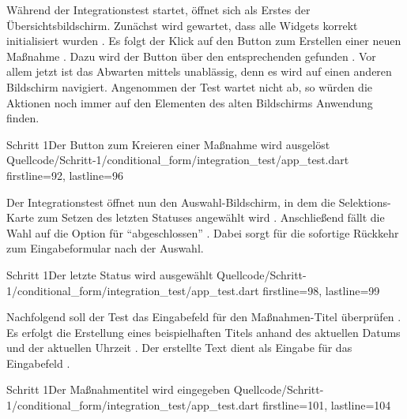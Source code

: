 Während der Integrationstest startet, öffnet sich als Erstes der Übersichtsbildschirm.
Zunächst wird gewartet, dass alle Widgets korrekt initialisiert wurden .
Es folgt der Klick auf den Button zum Erstellen einer neuen Maßnahme .
Dazu wird der Button über den entsprechenden  gefunden .
Vor allem jetzt ist das Abwarten mittels   unablässig, denn es wird auf einen anderen Bildschirm navigiert.
Angenommen der Test wartet nicht ab, so würden die Aktionen noch immer auf den Elementen des alten Bildschirms Anwendung finden. 

\begin{alexlisting}{Schritt 1}{Der Button zum Kreieren einer Maßnahme wird ausgelöst}
  {Quellcode/Schritt-1/conditional_form/integration_test/app_test.dart}
  {firstline=92, lastline=96}
  \label{lst:Schritt1ButtonKreierenMassnahmeAusgeloest}
\end{alexlisting}

Der Integrationstest öffnet nun den Auswahl-Bildschirm, in dem die Selektions-Karte zum Setzen des letzten Statuses angewählt wird .
Anschließend fällt die Wahl auf die Option für \enquote{abgeschlossen} .
Dabei sorgt  für die sofortige Rückkehr zum Eingabeformular nach der Auswahl.
 
\begin{alexlisting}{Schritt 1}{Der letzte Status wird ausgewählt}
  {Quellcode/Schritt-1/conditional_form/integration_test/app_test.dart}
  {firstline=98, lastline=99}
  \label{lst:Schritt1LetzterStatusWirdAusgewählt}
\end{alexlisting}

Nachfolgend soll der Test das Eingabefeld für den Maßnahmen-Titel überprüfen \Lst{\ref{lst:Schritt1MassnahmentitelWirdEingegeben}}.
Es erfolgt die Erstellung eines beispielhaften Titels anhand des aktuellen Datums und der aktuellen Uhrzeit .
Der erstellte Text dient als Eingabe für das Eingabefeld . 

\begin{alexlisting}{Schritt 1}{Der Maßnahmentitel wird eingegeben}
  {Quellcode/Schritt-1/conditional_form/integration_test/app_test.dart}
  {firstline=101, lastline=104}
  \label{lst:Schritt1MassnahmentitelWirdEingegeben}
\end{alexlisting}


